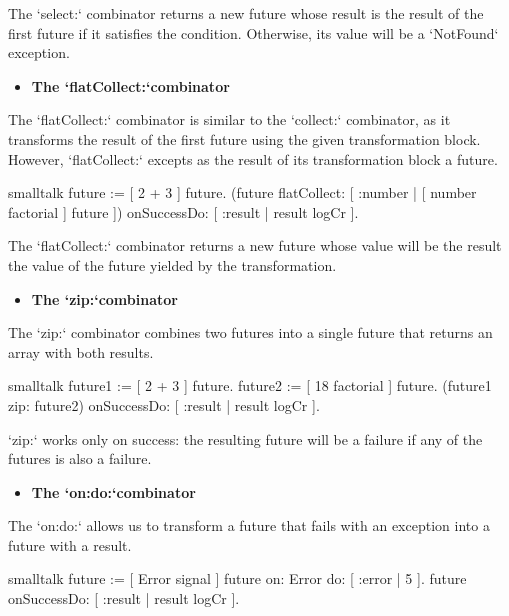 \documentclass[10pt,twoside,english]{_support/latex/sbabook/sbabook}
\begin{document}
The `select:` combinator returns a new future whose result is the result of the first future if it satisfies the condition. Otherwise, its value will be a `NotFound` exception.

\begin{itemize}
\item \textbf{The `flatCollect:`combinator}
\end{itemize}

The `flatCollect:` combinator is similar to the `collect:` combinator, as it transforms the result of the first future using the given transformation block. However, `flatCollect:` excepts as the result of its transformation block a future.

\begin{displaycode}{smalltalk}
future := [ 2 + 3 ] future.
(future flatCollect: [ :number | [ number factorial ] future ])
    onSuccessDo: [ :result | result logCr ].
\end{displaycode}

The `flatCollect:` combinator returns a new future whose value will be the result the value of the future yielded by the transformation.

\begin{itemize}
\item \textbf{The `zip:`combinator}
\end{itemize}

The `zip:` combinator combines two futures into a single future that returns an array with both results.

\begin{displaycode}{smalltalk}
future1 := [ 2 + 3 ] future.
future2 := [ 18 factorial ] future.
(future1 zip: future2)
    onSuccessDo: [ :result | result logCr ].
\end{displaycode}

`zip:` works only on success: the resulting future will be a failure if any of the futures is also a failure.

\begin{itemize}
\item \textbf{The `on:do:`combinator}
\end{itemize}

The `on:do:` allows us to transform a future that fails with an exception into a future with a result.

\begin{displaycode}{smalltalk}
future := [ Error signal ] future
    on: Error do: [ :error | 5 ].
future onSuccessDo: [ :result | result logCr ].
\end{displaycode}
\end{document}
